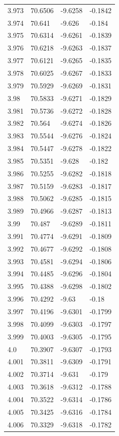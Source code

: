 \begin{tabular}{llll}
3.973 & 70.6506 & -9.6258 & -0.1842 \\
3.974 & 70.641 & -9.626 & -0.184 \\
3.975 & 70.6314 & -9.6261 & -0.1839 \\
3.976 & 70.6218 & -9.6263 & -0.1837 \\
3.977 & 70.6121 & -9.6265 & -0.1835 \\
3.978 & 70.6025 & -9.6267 & -0.1833 \\
3.979 & 70.5929 & -9.6269 & -0.1831 \\
3.98 & 70.5833 & -9.6271 & -0.1829 \\
3.981 & 70.5736 & -9.6272 & -0.1828 \\
3.982 & 70.564 & -9.6274 & -0.1826 \\
3.983 & 70.5544 & -9.6276 & -0.1824 \\
3.984 & 70.5447 & -9.6278 & -0.1822 \\
3.985 & 70.5351 & -9.628 & -0.182 \\
3.986 & 70.5255 & -9.6282 & -0.1818 \\
3.987 & 70.5159 & -9.6283 & -0.1817 \\
3.988 & 70.5062 & -9.6285 & -0.1815 \\
3.989 & 70.4966 & -9.6287 & -0.1813 \\
3.99 & 70.487 & -9.6289 & -0.1811 \\
3.991 & 70.4774 & -9.6291 & -0.1809 \\
3.992 & 70.4677 & -9.6292 & -0.1808 \\
3.993 & 70.4581 & -9.6294 & -0.1806 \\
3.994 & 70.4485 & -9.6296 & -0.1804 \\
3.995 & 70.4388 & -9.6298 & -0.1802 \\
3.996 & 70.4292 & -9.63 & -0.18 \\
3.997 & 70.4196 & -9.6301 & -0.1799 \\
3.998 & 70.4099 & -9.6303 & -0.1797 \\
3.999 & 70.4003 & -9.6305 & -0.1795 \\
4.0 & 70.3907 & -9.6307 & -0.1793 \\
4.001 & 70.3811 & -9.6309 & -0.1791 \\
4.002 & 70.3714 & -9.631 & -0.179 \\
4.003 & 70.3618 & -9.6312 & -0.1788 \\
4.004 & 70.3522 & -9.6314 & -0.1786 \\
4.005 & 70.3425 & -9.6316 & -0.1784 \\
4.006 & 70.3329 & -9.6318 & -0.1782 \\

\end{tabular}

